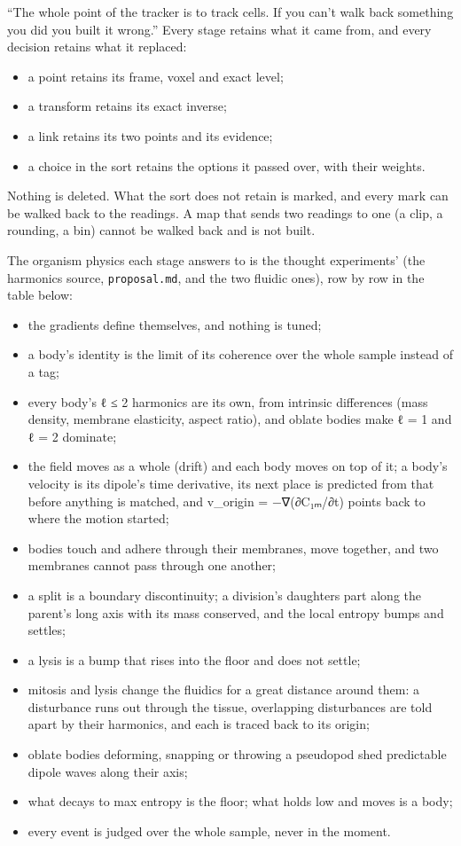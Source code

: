 “The whole point of the tracker is to track cells. If you can't walk back something you did you built it wrong.” Every stage retains what it came from, and every decision retains what it replaced:

\begin{itemize}
\item a point retains its frame, voxel and exact level;
\item a transform retains its exact inverse;
\item a link retains its two points and its evidence;
\item a choice in the sort retains the options it passed over, with their weights.
\end{itemize}

Nothing is deleted. What the sort does not retain is marked, and every mark can be walked back to the readings. A map that sends two readings to one (a clip, a rounding, a bin) cannot be walked back and is not built.

The organism physics each stage answers to is the thought experiments' (the harmonics source, \texttt{proposal.\allowbreak{}md}, and the two fluidic ones), row by row in the table below:

\begin{itemize}
\item the gradients define themselves, and nothing is tuned;
\item a body's identity is the limit of its coherence over the whole sample instead of a tag;
\item every body's ℓ ≤ 2 harmonics are its own, from intrinsic differences (mass density, membrane elasticity, aspect ratio), and oblate bodies make ℓ = 1 and ℓ = 2 dominate;
\item the field moves as a whole (drift) and each body moves on top of it; a body's velocity is its dipole's time derivative, its next place is predicted from that before anything is matched, and v\_\allowbreak{}origin = −∇(∂C₁ₘ/∂t) points back to where the motion started;
\item bodies touch and adhere through their membranes, move together, and two membranes cannot pass through one another;
\item a split is a boundary discontinuity; a division's daughters part along the parent's long axis with its mass conserved, and the local entropy bumps and settles;
\item a lysis is a bump that rises into the floor and does not settle;
\item mitosis and lysis change the fluidics for a great distance around them: a disturbance runs out through the tissue, overlapping disturbances are told apart by their harmonics, and each is traced back to its origin;
\item oblate bodies deforming, snapping or throwing a pseudopod shed predictable dipole waves along their axis;
\item what decays to max entropy is the floor; what holds low and moves is a body;
\item every event is judged over the whole sample, never in the moment.
\end{itemize}

